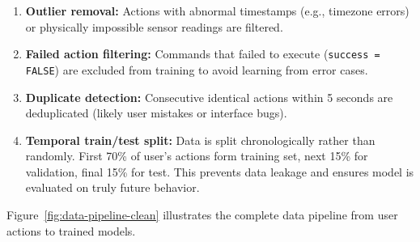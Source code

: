 \begin{enumerate}
    \item \textbf{Outlier removal:} Actions with abnormal timestamps (e.g., timezone errors) or physically impossible sensor readings are filtered.
    
    \item \textbf{Failed action filtering:} Commands that failed to execute (\texttt{success = FALSE}) are excluded from training to avoid learning from error cases.
    
    \item \textbf{Duplicate detection:} Consecutive identical actions within 5 seconds are deduplicated (likely user mistakes or interface bugs).
    
    \item \textbf{Temporal train/test split:} Data is split chronologically rather than randomly. First 70\% of user's actions form training set, next 15\% for validation, final 15\% for test. This prevents data leakage and ensures model is evaluated on truly future behavior.
\end{enumerate}

Figure~\ref{fig:data-pipeline-clean} illustrates the complete data pipeline from user actions to trained models.

